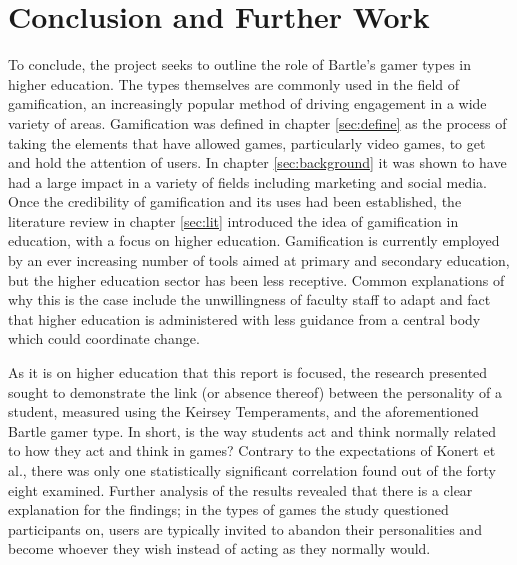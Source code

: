 \documentclass[12pt,a4paper,twoside]{report}
\begin{document}
\chapter{Conclusion and Further Work}
\label{sec:conclusion}
To conclude, the project seeks to outline the role of Bartle's gamer types in higher education. The types themselves are commonly used in the field of gamification, an increasingly popular method of driving engagement in a wide variety of areas. Gamification was defined in chapter \ref{sec:define} as the process of taking the elements that have allowed games, particularly video games, to get and hold the attention of users. In chapter \ref{sec:background} it was shown to have had a large impact in a variety of fields including marketing and social media. Once the credibility of gamification and its uses had been established, the literature review in chapter \ref{sec:lit} introduced the idea of gamification in education, with a focus on higher education. Gamification is currently employed by an ever increasing number of tools aimed at primary and secondary education, but the higher education sector has been less receptive. Common explanations of why this is the case include the unwillingness of faculty staff to adapt and fact that higher education is administered with less guidance from a central body which could coordinate change.

As it is on higher education that this report is focused, the research presented sought to demonstrate the link (or absence thereof) between the personality of a student, measured using the Keirsey Temperaments, and the aforementioned Bartle gamer type. In short, is the way students act and think normally related to how they act and think in games? Contrary to the expectations of Konert et al., there was only one statistically significant correlation found out of the forty eight examined. Further analysis of the results revealed that there is a clear explanation for the findings; in the types of games the study questioned participants on, users are typically invited to abandon their personalities and become whoever they wish instead of acting as they normally would.
\end{document}
